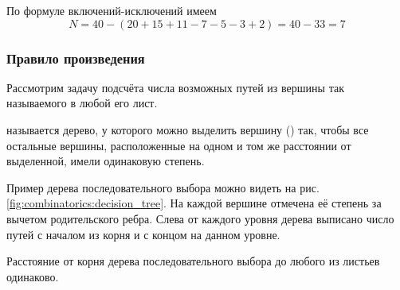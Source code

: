 \begin{Answer}
    \noindent
    По формуле включений-исключений имеем
    \[
        N = 40 - (20 + 15 + 11 - 7 - 5 - 3 + 2) = 40 - 33 = 7
    \]
\end{Answer}

\subsubsection{Правило произведения}

Рассмотрим задачу подсчёта числа возможных путей из вершины так называемого  в любой его лист.

\begin{definition}
     называется дерево, у которого можно выделить вершину () так,
    чтобы все остальные вершины, расположенные на одном и том же расстоянии от выделенной, имели одинаковую степень.
\end{definition}

Пример дерева последовательного выбора можно видеть на рис. \ref{fig:combinatorics:decision_tree}.
На каждой вершине отмечена её степень за вычетом родительского ребра.
Слева от каждого уровня дерева выписано число путей с началом из корня и с концом на данном уровне.

\begin{statement}
    Расстояние от корня дерева последовательного выбора до любого из листьев одинаково.
\end{statement}


